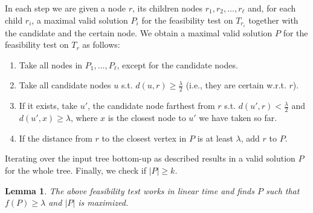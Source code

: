 \documentclass[11pt,a4paper]{article}
\newtheorem{lemma}{Lemma}
\theoremstyle{definition}
\theoremstyle{remark}
\begin{document}
In each step we are given a node $r$, its children nodes $r_{1},r_{2},\ldots,r_{\ell}$ and, for each child $r_{i}$, a maximal valid
solution $P_{i}$ for the feasibility test on $T_{r_{i}}$ together with the candidate and the certain node. We obtain a maximal valid solution $P$ for the feasibility test on $T_{r}$ as follows:
\begin{enumerate}
\item Take all nodes in $P_{1},\ldots,P_{\ell}$, except for the candidate nodes.\label{linear time step 1}
\item Take all candidate nodes $u$ s.t. $d(u,r) \geq \frac{\lambda}{2}$ (i.e., they are certain w.r.t. $r$).\label{linear time step 2}
\item If it exists, take $u'$, the candidate node farthest from $r$ s.t. $d(u',r) < \frac{\lambda}{2}$ and $d(u',x)\geq \lambda$, where $x$ is the closest node to $u'$ we have taken so far.\label{linear time step 3}
\item If the distance from $r$ to the closest vertex in $P$ is at least $\lambda$, add $r$ to $P$.\label{linear time step 4}
\end{enumerate}
Iterating over the input tree bottom-up as described results in a valid solution $P$ for the whole tree. Finally, we check if $|P|\geq k$.

\begin{lemma}
\label{lineartimecorrectness}
The above feasibility test works in linear time and finds $P$ such that $f(P)\geq\lambda$ and $|P|$ is maximized.
\end{lemma}
\end{document}
